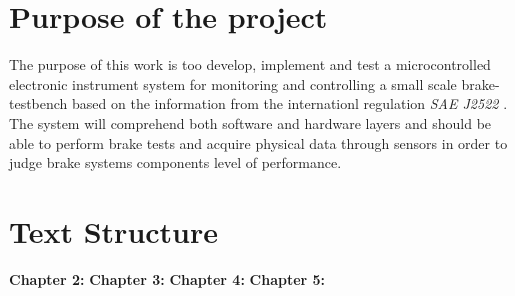 	\section{Purpose of the project}
		The purpose of this work is too develop, implement and test a microcontrolled electronic instrument system for monitoring and controlling a small scale brake-testbench based on the information from the internationl regulation \textit{SAE J2522} \cite{sae}. The system will comprehend both software and hardware layers and should be able to perform brake tests and acquire physical data through sensors in order to judge brake systems components level of performance.


	\section{Text Structure} 
	\textbf{Chapter 2:}
	\textbf{Chapter 3:}
	\textbf{Chapter 4:}
	\textbf{Chapter 5:}
